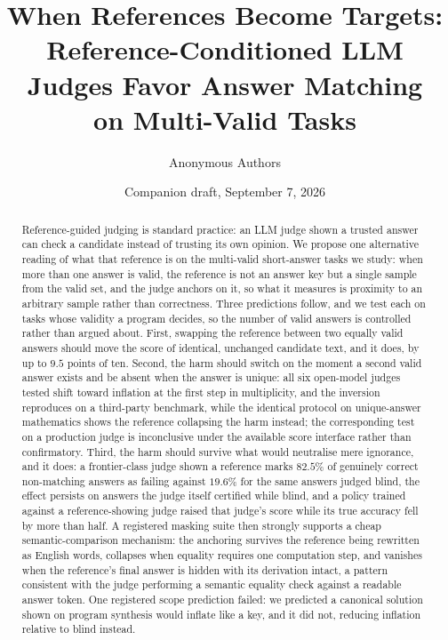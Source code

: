 \documentclass[11pt]{article}
\title{When References Become Targets:\\ Reference-Conditioned LLM Judges Favor Answer Matching\\ on Multi-Valid Tasks}
\author{Anonymous Authors}
\date{Companion draft, September 7, 2026}
\begin{document}
\maketitle

\begin{abstract}
\noindent
Reference-guided judging is standard practice: an LLM judge shown a trusted answer can check a candidate instead of trusting its own opinion.
We propose one alternative reading of what that reference is on the multi-valid short-answer tasks we study: when more than one answer is valid, the reference is not an answer key but a single sample from the valid set, and the judge anchors on it, so what it measures is proximity to an arbitrary sample rather than correctness.
Three predictions follow, and we test each on tasks whose validity a program decides, so the number of valid answers is controlled rather than argued about.
First, swapping the reference between two equally valid answers should move the score of identical, unchanged candidate text, and it does, by up to $9.5$ points of ten.
Second, the harm should switch on the moment a second valid answer exists and be absent when the answer is unique: all six open-model judges tested shift toward inflation at the first step in multiplicity, and the inversion reproduces on a third-party benchmark, while the identical protocol on unique-answer mathematics shows the reference collapsing the harm instead; the corresponding test on a production judge is inconclusive under the available score interface rather than confirmatory.
Third, the harm should survive what would neutralise mere ignorance, and it does: a frontier-class judge shown a reference marks $82.5\%$ of genuinely correct non-matching answers as failing against $19.6\%$ for the same answers judged blind, the effect persists on answers the judge itself certified while blind, and a policy trained against a reference-showing judge raised that judge's score while its true accuracy fell by more than half.
A registered masking suite then strongly supports a cheap semantic-comparison mechanism: the anchoring survives the reference being rewritten as English words, collapses when equality requires one computation step, and vanishes when the reference's final answer is hidden with its derivation intact, a pattern consistent with the judge performing a semantic equality check against a readable answer token.
One registered scope prediction failed: we predicted a canonical solution shown on program synthesis would inflate like a key, and it did not, reducing inflation relative to blind instead.

\end{abstract}
\end{document}
